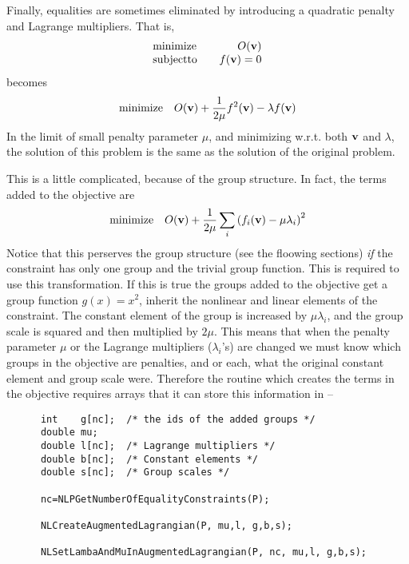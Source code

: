 \documentclass[12pt]{article}
\begin{document}
    Finally, equalities are sometimes eliminated by introducing a quadratic penalty and Lagrange multipliers.
    That is, 
    \begin{displaymath}
    \begin{array}{lr}
      \displaystyle {\rm minimize}&\displaystyle\quad O({\bf v}) \\
      \displaystyle {\rm subject to}& \displaystyle\quad f({\bf v})=0\\
    \end{array}
    \end{displaymath}
    becomes
    \begin{displaymath}
      {\rm minimize}\quad O({\bf v}) + {1\over{2\mu}}f^2({\bf v})-\lambda f({\bf v})
    \end{displaymath}
    In the limit of small penalty parameter $\mu$, and minimizing w.r.t. both ${\bf v}$ and $\lambda$, the
    solution of this problem is the same as the solution of the original problem.

    This is a little complicated, because of the group structure. In fact, the terms added to the objective are
    \begin{displaymath}
      {\rm minimize}\quad O({\bf v}) + {1\over{2\mu}}\sum_i \left( f_i({\bf v})-\mu\lambda_i\right)^2
    \end{displaymath}
    Notice that this perserves the group structure (see the floowing sections) {\it if} the constraint has
    only one group and the trivial group function. This is required to use this transformation. If this is
    true the groups added to the objective get a group function $g(x)=x^2$,
    inherit the nonlinear and linear elements of the constraint. The constant element of the group
    is increased by $\mu\lambda_i$, and the group scale is squared and then multiplied by $2\mu$. This
    means that when the penalty parameter $\mu$ or the Lagrange multipliers ($\lambda_i$'s) are changed 
    we must know which groups in the objective are penalties, and or each, what the original constant
    element and group scale were. Therefore the routine which creates the terms in the objective 
    requires arrays that it can store this information in --
    \begin{verbatim}
      int    g[nc];  /* the ids of the added groups */
      double mu;
      double l[nc];  /* Lagrange multipliers */
      double b[nc];  /* Constant elements */
      double s[nc];  /* Group scales */

      nc=NLPGetNumberOfEqualityConstraints(P);

      NLCreateAugmentedLagrangian(P, mu,l, g,b,s);

      NLSetLambaAndMuInAugmentedLagrangian(P, nc, mu,l, g,b,s);
    \end{verbatim}
\end{document}
